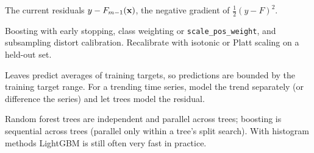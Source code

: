 \A The current residuals $y-F_{m-1}(\mathbf{x})$, the negative gradient of $\frac12(y-F)^2$.

\A Boosting with early stopping, class weighting or \texttt{scale\_pos\_weight}, and subsampling distort calibration. Recalibrate with isotonic or Platt scaling on a held-out set.

\A Leaves predict averages of training targets, so predictions are bounded by the training target range. For a trending time series, model the trend separately (or difference the series) and let trees model the residual.

\A Random forest trees are independent and parallel across trees; boosting is sequential across trees (parallel only within a tree's split search). With histogram methods LightGBM is still often very fast in practice.
